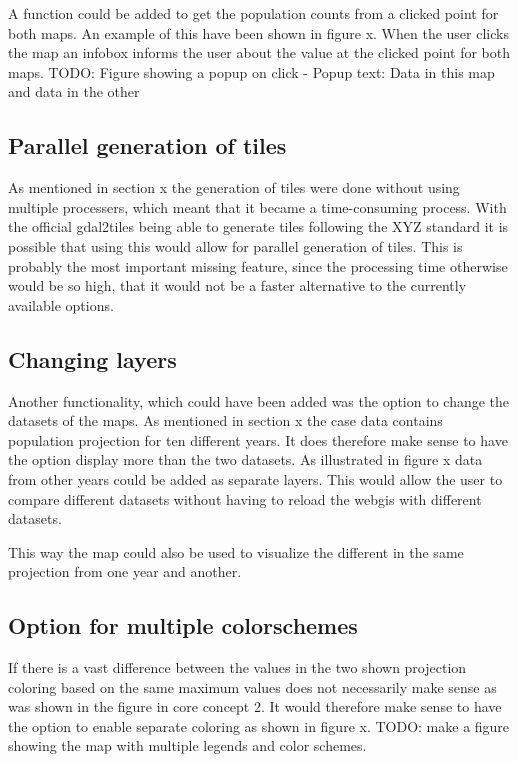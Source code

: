 A function could be added to get the population counts from a clicked point for both maps. An example of this have been shown in figure x. When the user clicks the map an infobox informs the user about the value at the clicked point for both maps. 
TODO: Figure showing a popup on click
-	Popup text: Data in this map and data in the other



\subsection{Parallel generation of tiles}
As mentioned in section x the generation of tiles were done without using multiple processers, which meant that it became a time-consuming process. With the official gdal2tiles being able to generate tiles following the XYZ standard it is possible that using this would allow for parallel generation of tiles. 
This is probably the most important missing feature, since the processing time otherwise would be so high, that it would not be a faster alternative to the currently available options. 

\subsection{Changing layers}
Another functionality, which could have been added was the option to change the datasets of the maps. As mentioned in section x the case data contains population projection for ten different years. It does therefore make sense to have the option display more than the two datasets.  As illustrated in figure x data from other years could be added as separate layers. This would allow the user to compare different datasets without having to reload the webgis with different datasets.

This way the map could also be used to visualize the different in the same projection from one year and another.
\subsection{Option for multiple colorschemes}
If there is a vast difference between the values in the two shown projection coloring based on the same maximum values does not necessarily make sense as was shown in the figure in core concept 2. It would therefore make sense to have the option to enable separate coloring as shown in figure x. 
TODO: make a figure showing the map with multiple legends and color schemes. 



